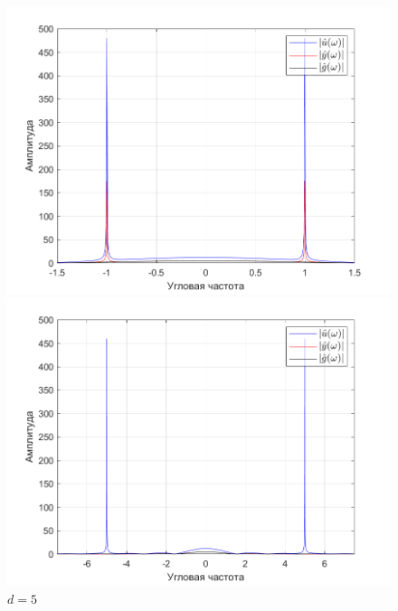 \documentclass[a4paper]{article}
\begin{document}
\begin{figure}[H]
    \begin{minipage}{0.5\textwidth}
        \centering
        \includegraphics[width=\linewidth]{ex1_2/a1=0_a2=25_b1=10.5_b2=25_d=1/h4.png}
        \caption{$d=1$}
    \end{minipage}
    \begin{minipage}{0.5\textwidth}
        \centering
        \includegraphics[width=\linewidth]{ex1_2/a1=0_a2=25_b1=10.5_b2=25_d=5/h4.png}
        \caption{$d=5$}
    \end{minipage}
\end{figure}
\end{document}
